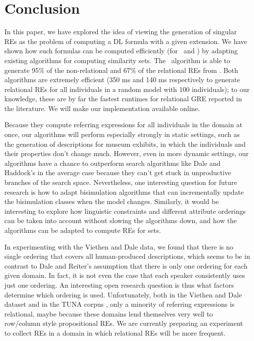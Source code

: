 \section{Conclusion} \label{sec:conclusion}

In this paper, we have explored the idea of viewing the generation of
singular REs as the problem of computing a DL formula with a given
extension.  We have shown how such formulas can be computed
efficiently (for \alc\ and \el) by adapting existing algorithms for
computing similarity sets.  The \el\ algorithm is able to generate
95\% of the non-relational and 67\% of the relational REs from
.  Both algorithms
are extremely efficient (350 ms and 140 ms respectively to generate
relational REs for all individuals in a random model with 100
individuals); to our knowledge, these are by far the fastest runtimes
for relational GRE reported in the literature.  We will make our
implementation available online.

Because they compute referring expressions for all individuals in the
domain at once, our algorithms will perform especially strongly in
static settings, such as the generation of descriptions for museum
exhibits, in which the individuals and their properties don't change
much.  However, even in more dynamic settings, our algorithms have a
chance to outperform search algorithms like Dale and Haddock's in the
average case because they can't get stuck in unproductive branches of
the search space.  Nevertheless, one interesting question for future
research is how to adapt bisimulation algorithms that can
incrementally update the bisimulation classes when the model changes.
Similarly, it would be interesting to explore how linguistic
constraints and different attribute orderings can be taken into
account without slowing the algorithms down, and how the algorithms
can be adapted to compute REs for sets.

In experimenting with the Viethen and Dale data, we found that
there is no single ordering that covers all human-produced
descriptions, which seems to be in contrast to Dale and Reiter's
 assumption that there is only one ordering for
each given domain.  In fact, it is not even the case that each speaker
consistently uses just one ordering.  An interesting open research
question is thus what factors determine which ordering is used.
Unfortunately, both in the Viethen and Dale dataset and in the TUNA
corpus \cite{deemter06:_build_seman_trans_corpus_for}, only a minority
of referring expressions is relational, maybe because these domains
lend themselves very well to row/column style propositional REs.  We
are currently preparing an experiment to collect REs in a domain in
which relational REs will be more frequent.



